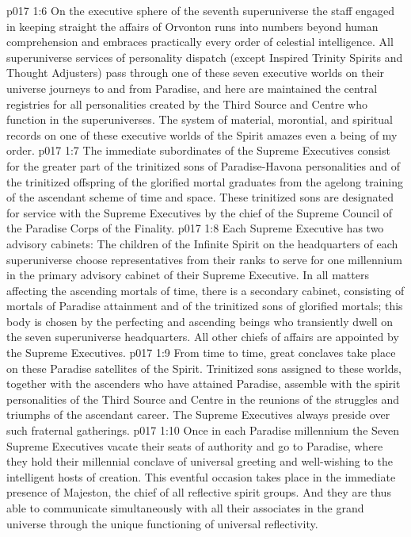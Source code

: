 \vs p017 1:6 On the executive sphere of the seventh superuniverse the staff engaged in keeping straight the affairs of Orvonton runs into numbers beyond human comprehension and embraces practically every order of celestial intelligence. All superuniverse services of personality dispatch (except Inspired Trinity Spirits and Thought Adjusters) pass through one of these seven executive worlds on their universe journeys to and from Paradise, and here are maintained the central registries for all personalities created by the Third Source and Centre who function in the superuniverses. The system of material, morontial, and spiritual records on one of these executive worlds of the Spirit amazes even a being of my order.
\vs p017 1:7 The immediate subordinates of the Supreme Executives consist for the greater part of the trinitized sons of Paradise\hyp{}Havona personalities and of the trinitized offspring of the glorified mortal graduates from the agelong training of the ascendant scheme of time and space. These trinitized sons are designated for service with the Supreme Executives by the chief of the Supreme Council of the Paradise Corps of the Finality.
\vs p017 1:8 Each Supreme Executive has two advisory cabinets: The children of the Infinite Spirit on the headquarters of each superuniverse choose representatives from their ranks to serve for one millennium in the primary advisory cabinet of their Supreme Executive. In all matters affecting the ascending mortals of time, there is a secondary cabinet, consisting of mortals of Paradise attainment and of the trinitized sons of glorified mortals; this body is chosen by the perfecting and ascending beings who transiently dwell on the seven superuniverse headquarters. All other chiefs of affairs are appointed by the Supreme Executives.
\vs p017 1:9 \pc From time to time, great conclaves take place on these Paradise satellites of the Spirit. Trinitized sons assigned to these worlds, together with the ascenders who have attained Paradise, assemble with the spirit personalities of the Third Source and Centre in the reunions of the struggles and triumphs of the ascendant career. The Supreme Executives always preside over such fraternal gatherings.
\vs p017 1:10 Once in each Paradise millennium the Seven Supreme Executives vacate their seats of authority and go to Paradise, where they hold their millennial conclave of universal greeting and well\hyp{}wishing to the intelligent hosts of creation. This eventful occasion takes place in the immediate presence of Majeston, the chief of all reflective spirit groups. And they are thus able to communicate simultaneously with all their associates in the grand universe through the unique functioning of universal reflectivity.
